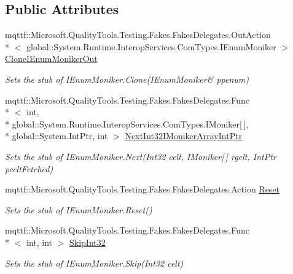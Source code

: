\subsection*{Public Attributes}
\begin{DoxyCompactItemize}
\item 
mqttf\-::\-Microsoft.\-Quality\-Tools.\-Testing.\-Fakes.\-Fakes\-Delegates.\-Out\-Action\\*
$<$ global\-::\-System.\-Runtime.\-Interop\-Services.\-Com\-Types.\-I\-Enum\-Moniker $>$ \hyperlink{class_system_1_1_runtime_1_1_interop_services_1_1_com_types_1_1_fakes_1_1_stub_i_enum_moniker_ab573089687e1054a53c52d59bf265ad7}{Clone\-I\-Enum\-Moniker\-Out}
\begin{DoxyCompactList}\small\item\em Sets the stub of I\-Enum\-Moniker.\-Clone(I\-Enum\-Moniker\& ppenum)\end{DoxyCompactList}\item 
mqttf\-::\-Microsoft.\-Quality\-Tools.\-Testing.\-Fakes.\-Fakes\-Delegates.\-Func\\*
$<$ int, \\*
global\-::\-System.\-Runtime.\-Interop\-Services.\-Com\-Types.\-I\-Moniker\mbox{[}$\,$\mbox{]}, \\*
global\-::\-System.\-Int\-Ptr, int $>$ \hyperlink{class_system_1_1_runtime_1_1_interop_services_1_1_com_types_1_1_fakes_1_1_stub_i_enum_moniker_af68062edeb0fb31e8b243ba0251d6057}{Next\-Int32\-I\-Moniker\-Array\-Int\-Ptr}
\begin{DoxyCompactList}\small\item\em Sets the stub of I\-Enum\-Moniker.\-Next(\-Int32 celt, I\-Moniker\mbox{[}$\,$\mbox{]} rgelt, Int\-Ptr pcelt\-Fetched)\end{DoxyCompactList}\item 
mqttf\-::\-Microsoft.\-Quality\-Tools.\-Testing.\-Fakes.\-Fakes\-Delegates.\-Action \hyperlink{class_system_1_1_runtime_1_1_interop_services_1_1_com_types_1_1_fakes_1_1_stub_i_enum_moniker_a81fc38550a5fb2167a83ec2d1ed9298c}{Reset}
\begin{DoxyCompactList}\small\item\em Sets the stub of I\-Enum\-Moniker.\-Reset()\end{DoxyCompactList}\item 
mqttf\-::\-Microsoft.\-Quality\-Tools.\-Testing.\-Fakes.\-Fakes\-Delegates.\-Func\\*
$<$ int, int $>$ \hyperlink{class_system_1_1_runtime_1_1_interop_services_1_1_com_types_1_1_fakes_1_1_stub_i_enum_moniker_a313c803c67b41e82c96affab3b56ce30}{Skip\-Int32}
\begin{DoxyCompactList}\small\item\em Sets the stub of I\-Enum\-Moniker.\-Skip(\-Int32 celt)\end{DoxyCompactList}\end{DoxyCompactItemize}


